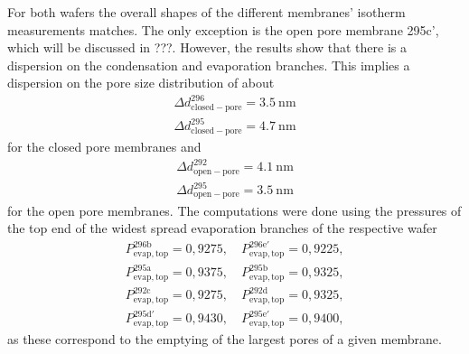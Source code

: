 \documentclass[../thesis.tex]{subfiles}
\begin{document}
        For both wafers the overall shapes of the different membranes' isotherm measurements matches. The only exception is the open pore membrane 295c', which will be discussed in ???. However, the results show that there is a dispersion on the condensation and evaporation branches. This implies a dispersion on the pore size distribution of about
        \begin{align*}
          \Delta d_\mathrm{closed-pore}^\mathrm{296} = \SI{3,5}{\nano\meter} \\
          \Delta d_\mathrm{closed-pore}^\mathrm{295} = \SI{4,7}{\nano\meter}
        \end{align*}
        for the closed pore membranes and
        \begin{align*}
          \Delta d_\mathrm{open-pore}^\mathrm{292} = \SI{4,1}{\nano\meter} \\
          \Delta d_\mathrm{open-pore}^\mathrm{295} = \SI{3,5}{\nano\meter}
        \end{align*}
        for the open pore membranes. The computations were done using the pressures of the top end of the widest spread evaporation branches of the respective wafer
        \begin{align*}
          P_\mathrm{evap,top}^\mathrm{296b}=0,9275,\quad P_\mathrm{evap,top}^\mathrm{296e'}=0,9225, \\
          P_\mathrm{evap,top}^\mathrm{295a}=0,9375,\quad P_\mathrm{evap,top}^\mathrm{295b}=0,9325, \\
          P_\mathrm{evap,top}^\mathrm{292c}=0,9275,\quad P_\mathrm{evap,top}^\mathrm{292d}=0,9325, \\
          P_\mathrm{evap,top}^\mathrm{295d'}=0,9430,\quad P_\mathrm{evap,top}^\mathrm{295e'}=0,9400,
        \end{align*}
        as these correspond to the emptying of the largest pores of a given membrane.
        \medskip
\end{document}
